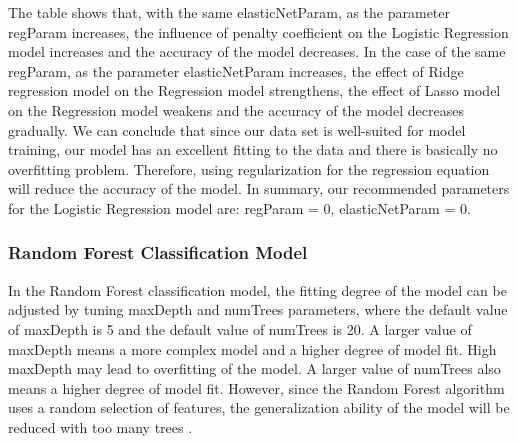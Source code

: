 \documentclass[conference]{IEEEtran}
\begin{document}
The table shows that, with the same elasticNetParam, as the parameter regParam increases, the influence of penalty coefficient on the Logistic Regression model increases and the accuracy of the model decreases. In the case of the same regParam, as the parameter elasticNetParam increases, the effect of Ridge regression model on the Regression model strengthens, the effect of Lasso model on the Regression model weakens and the accuracy of the model decreases gradually. We can conclude that since our data set is well-suited for model training, our model has an excellent fitting to the data and there is basically no overfitting problem. Therefore, using regularization for the regression equation will reduce the accuracy of the model. In summary, our recommended parameters for the Logistic Regression model are: regParam = 0, elasticNetParam = 0. 

\subsubsection{Random Forest Classification Model}
In the Random Forest classification model, the fitting degree of the model can be adjusted by tuning maxDepth and numTrees parameters, where the default value of maxDepth is 5 and the default value of numTrees is 20. A larger value of maxDepth means a more complex model and a higher degree of model fit. High maxDepth may lead to overfitting of the model. A larger value of numTrees also means a higher degree of model fit. However, since the Random Forest algorithm uses a random selection of features, the generalization ability of the model will be reduced with too many trees \cite{b30}. 
\end{document}
